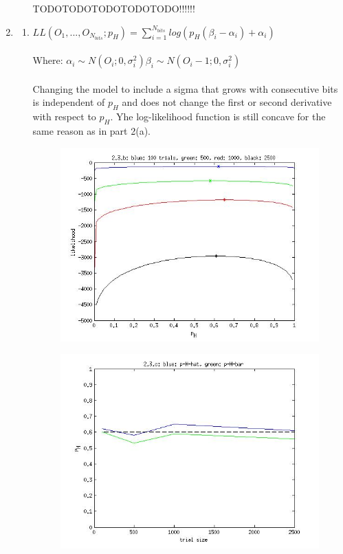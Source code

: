\documentclass{article}
\begin{document}
\begin{enumerate}
\begin{enumerate}
		TODOTODOTODOTODOTODO!!!!!!
		\vspace{0.001em}\\
		\end{enumerate}
		\item
		\begin{enumerate}
		\item $LL(O_1,{...},O_{N_{bits}};p_H)=\sum_{i=1}^{N_{bits}}log(p_H(\beta_i-\alpha_i)+\alpha_i)$\\
		\vspace{0.001em}\\
		Where: \hspace{2em}$\alpha_i\sim{}N(O_i;0,\sigma_i^2)$\hspace{2em}$\beta_i\sim{}N(O_i-1;0,\sigma_i^2)$\\
		\vspace{0.001em}\\
		Changing the model to include a sigma that grows with consecutive bits is independent of $p_H$ and does not change the first or second derivative with respect to $p_H$. Yhe log-likelihood function is still concave for the same reason as in part 2(a).
		\begin{figure}[h]
		\includegraphics[scale=0.75]{hw2_ques2_3_b}
		\end{figure}
		\begin{figure}[h]
		\includegraphics[scale=0.75]{hw2_ques2_3_c}

\end{figure}
\end{enumerate}
\end{enumerate}
\end{document}
